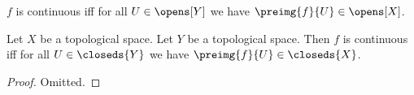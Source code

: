 


\begin{definition}\label{continuous}
    $f$ is continuous iff for all $U \in \opens[Y]$ we have $\preimg{f}{U} \in \opens[X]$.
\end{definition}

\begin{proposition}\label{continuous_definition_by_closeds}
    Let $X$ be a topological space.
    Let $Y$ be a topological space.
    Then $f$ is continuous iff for all $U \in \closeds{Y}$ we have $\preimg{f}{U} \in \closeds{X}$.
\end{proposition}
\begin{proof}
    Omitted.
\end{proof}
